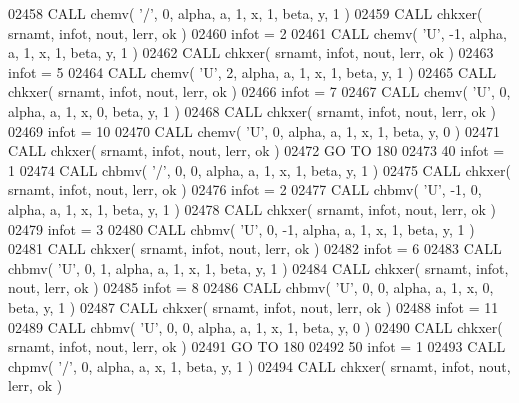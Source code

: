 \begin{DoxyCode}
02458       \textcolor{keyword}{CALL }chemv( \textcolor{stringliteral}{'/'}, 0, alpha, a, 1, x, 1, beta, y, 1 )
02459       \textcolor{keyword}{CALL }chkxer( srnamt, infot, nout, lerr, ok )
02460       infot = 2
02461       \textcolor{keyword}{CALL }chemv( \textcolor{stringliteral}{'U'}, -1, alpha, a, 1, x, 1, beta, y, 1 )
02462       \textcolor{keyword}{CALL }chkxer( srnamt, infot, nout, lerr, ok )
02463       infot = 5
02464       \textcolor{keyword}{CALL }chemv( \textcolor{stringliteral}{'U'}, 2, alpha, a, 1, x, 1, beta, y, 1 )
02465       \textcolor{keyword}{CALL }chkxer( srnamt, infot, nout, lerr, ok )
02466       infot = 7
02467       \textcolor{keyword}{CALL }chemv( \textcolor{stringliteral}{'U'}, 0, alpha, a, 1, x, 0, beta, y, 1 )
02468       \textcolor{keyword}{CALL }chkxer( srnamt, infot, nout, lerr, ok )
02469       infot = 10
02470       \textcolor{keyword}{CALL }chemv( \textcolor{stringliteral}{'U'}, 0, alpha, a, 1, x, 1, beta, y, 0 )
02471       \textcolor{keyword}{CALL }chkxer( srnamt, infot, nout, lerr, ok )
02472       \textcolor{keywordflow}{GO TO} 180
02473    40 infot = 1
02474       \textcolor{keyword}{CALL }chbmv( \textcolor{stringliteral}{'/'}, 0, 0, alpha, a, 1, x, 1, beta, y, 1 )
02475       \textcolor{keyword}{CALL }chkxer( srnamt, infot, nout, lerr, ok )
02476       infot = 2
02477       \textcolor{keyword}{CALL }chbmv( \textcolor{stringliteral}{'U'}, -1, 0, alpha, a, 1, x, 1, beta, y, 1 )
02478       \textcolor{keyword}{CALL }chkxer( srnamt, infot, nout, lerr, ok )
02479       infot = 3
02480       \textcolor{keyword}{CALL }chbmv( \textcolor{stringliteral}{'U'}, 0, -1, alpha, a, 1, x, 1, beta, y, 1 )
02481       \textcolor{keyword}{CALL }chkxer( srnamt, infot, nout, lerr, ok )
02482       infot = 6
02483       \textcolor{keyword}{CALL }chbmv( \textcolor{stringliteral}{'U'}, 0, 1, alpha, a, 1, x, 1, beta, y, 1 )
02484       \textcolor{keyword}{CALL }chkxer( srnamt, infot, nout, lerr, ok )
02485       infot = 8
02486       \textcolor{keyword}{CALL }chbmv( \textcolor{stringliteral}{'U'}, 0, 0, alpha, a, 1, x, 0, beta, y, 1 )
02487       \textcolor{keyword}{CALL }chkxer( srnamt, infot, nout, lerr, ok )
02488       infot = 11
02489       \textcolor{keyword}{CALL }chbmv( \textcolor{stringliteral}{'U'}, 0, 0, alpha, a, 1, x, 1, beta, y, 0 )
02490       \textcolor{keyword}{CALL }chkxer( srnamt, infot, nout, lerr, ok )
02491       \textcolor{keywordflow}{GO TO} 180
02492    50 infot = 1
02493       \textcolor{keyword}{CALL }chpmv( \textcolor{stringliteral}{'/'}, 0, alpha, a, x, 1, beta, y, 1 )
02494       \textcolor{keyword}{CALL }chkxer( srnamt, infot, nout, lerr, ok )

\end{DoxyCode}
